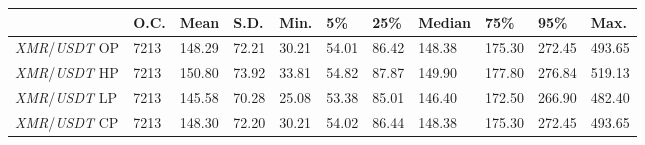 \begin{tabular}{lllllllllll}
\toprule
 & \textbf{O.C.} & \textbf{Mean} & \textbf{S.D.} & \textbf{Min.} & \textbf{5\%} & \textbf{25\%} & \textbf{Median} & \textbf{75\%} & \textbf{95\%} & \textbf{Max.} \\
\midrule
\emph{XMR}/\emph{USDT} OP & 7213 & 148.29 & 72.21 & 30.21 & 54.01 & 86.42 & 148.38 & 175.30 & 272.45 & 493.65 \\
\emph{XMR}/\emph{USDT} HP & 7213 & 150.80 & 73.92 & 33.81 & 54.82 & 87.87 & 149.90 & 177.80 & 276.84 & 519.13 \\
\emph{XMR}/\emph{USDT} LP & 7213 & 145.58 & 70.28 & 25.08 & 53.38 & 85.01 & 146.40 & 172.50 & 266.90 & 482.40 \\
\emph{XMR}/\emph{USDT} CP & 7213 & 148.30 & 72.20 & 30.21 & 54.02 & 86.44 & 148.38 & 175.30 & 272.45 & 493.65 \\
\bottomrule
\end{tabular}
